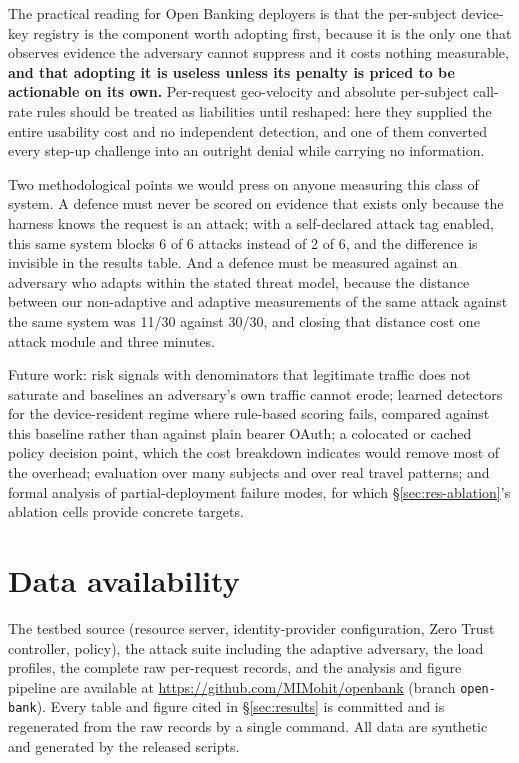 The practical reading for Open Banking deployers is that the per-subject device-key registry is the component worth adopting first, because it is the only one that observes evidence the adversary cannot suppress and it costs nothing measurable, \textbf{and that adopting it is useless unless its penalty is priced to be actionable on its own.} Per-request geo-velocity and absolute per-subject call-rate rules should be treated as liabilities until reshaped: here they supplied the entire usability cost and no independent detection, and one of them converted every step-up challenge into an outright denial while carrying no information.

Two methodological points we would press on anyone measuring this class of system. A defence must never be scored on evidence that exists only because the harness knows the request is an attack; with a self-declared attack tag enabled, this same system blocks 6 of 6 attacks instead of 2 of 6, and the difference is invisible in the results table. And a defence must be measured against an adversary who adapts within the stated threat model, because the distance between our non-adaptive and adaptive measurements of the same attack against the same system was 11/30 against 30/30, and closing that distance cost one attack module and three minutes.

Future work: risk signals with denominators that legitimate traffic does not saturate and baselines an adversary's own traffic cannot erode; learned detectors for the device-resident regime where rule-based scoring fails, compared against this baseline rather than against plain bearer OAuth; a colocated or cached policy decision point, which the cost breakdown indicates would remove most of the overhead; evaluation over many subjects and over real travel patterns; and formal analysis of partial-deployment failure modes, for which \S\ref{sec:res-ablation}'s ablation cells provide concrete targets.

\section*{Data availability}

The testbed source (resource server, identity-provider configuration, Zero Trust controller, policy), the attack suite including the adaptive adversary, the load profiles, the complete raw per-request records, and the analysis and figure pipeline are available at \url{https://github.com/MIMohit/openbank} (branch \texttt{open-bank}). Every table and figure cited in \S\ref{sec:results} is committed and is regenerated from the raw records by a single command. All data are synthetic and generated by the released scripts.

